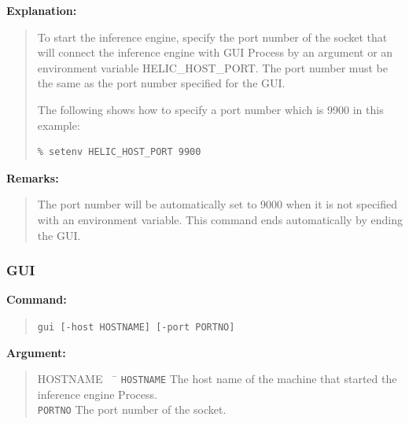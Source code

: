 {\bf Explanation:}
\begin{quote}
To start the inference engine, specify the port number of the socket that will connect the inference engine with GUI Process by an argument or an environment variable HELIC\_HOST\_PORT.
The port number must be the same as the port number specified for the GUI.

The following shows how to specify a port number which is 9900 in this example:

\begin{verbatim}
% setenv HELIC_HOST_PORT 9900
\end{verbatim}

\end{quote}

{\bf Remarks:}
\begin{quote}
The port number will be automatically set to 9000 when it is not specified with an environment variable.
This command ends automatically by ending the GUI.

\end{quote}

\subsubsection{GUI}

{\bf Command:}
\begin{quote}
\verb+gui [-host HOSTNAME] [-port PORTNO]+
\end{quote}

{\bf Argument:}
\begin{quote}
\begin{tabbing}
HOSTNAME \ \ \= \kill
\verb+HOSTNAME+ \> The host name of the machine that started the inference engine Process.\\
\verb+PORTNO+ \> The port number of the socket.\\
\end{tabbing}
\end{quote}

